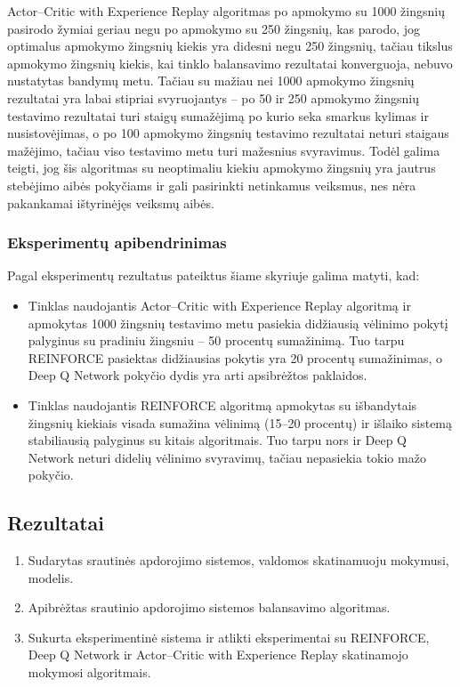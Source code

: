 \documentclass{VUMIFPSbakalaurinis}
\begin{document}
Actor–Critic with Experience Replay algoritmas po apmokymo su 1000 žingsnių pasirodo žymiai geriau negu po apmokymo su 250 žingsnių, kas parodo, jog optimalus apmokymo žingsnių kiekis yra didesni negu 250 žingsnių, tačiau tikslus apmokymo žingsnių kiekis, kai tinklo balansavimo rezultatai konverguoja, nebuvo nustatytas bandymų metu. Tačiau su mažiau nei 1000 apmokymo žingsnių rezultatai yra labai stipriai svyruojantys – po 50 ir 250 apmokymo žingsnių testavimo rezultatai turi staigų sumažėjimą po kurio seka smarkus kylimas ir nusistovėjimas, o po 100 apmokymo žingsnių testavimo rezultatai neturi staigaus mažėjimo, tačiau viso testavimo metu turi mažesnius svyravimus. Todėl galima teigti, jog šis algoritmas su neoptimaliu kiekiu apmokymo žingsnių yra jautrus stebėjimo aibės pokyčiams ir gali pasirinkti netinkamus veiksmus, nes nėra pakankamai ištyrinėjęs veiksmų aibės.

\subsubsection{Eksperimentų apibendrinimas}
Pagal eksperimentų rezultatus pateiktus šiame skyriuje galima matyti, kad:
\begin{itemize}
    \item Tinklas naudojantis Actor–Critic with Experience Replay algoritmą ir apmokytas 1000 žingsnių testavimo metu pasiekia didžiausią vėlinimo pokytį palyginus su pradiniu žingsniu – 50 procentų sumažinimą. Tuo tarpu REINFORCE pasiektas didžiausias pokytis yra 20 procentų sumažinimas, o Deep Q Network pokyčio dydis yra arti apsibrėžtos paklaidos.
    \item Tinklas naudojantis REINFORCE algoritmą apmokytas su išbandytais žingsnių kiekiais visada sumažina vėlinimą (15–20 procentų) ir išlaiko sistemą stabiliausią palyginus su kitais algoritmais. Tuo tarpu nors ir Deep Q Network neturi didelių vėlinimo svyravimų, tačiau nepasiekia tokio mažo pokyčio.
\end{itemize}
\subsection*{Rezultatai}
\begin{enumerate}
    \item Sudarytas srautinės apdorojimo sistemos, valdomos skatinamuoju mokymusi, modelis.
    \item Apibrėžtas srautinio apdorojimo sistemos balansavimo algoritmas.
    \item Sukurta eksperimentinė sistema ir atlikti eksperimentai su REINFORCE, Deep Q Network ir Actor–Critic with Experience Replay skatinamojo mokymosi algoritmais.
\end{enumerate}
\end{document}
